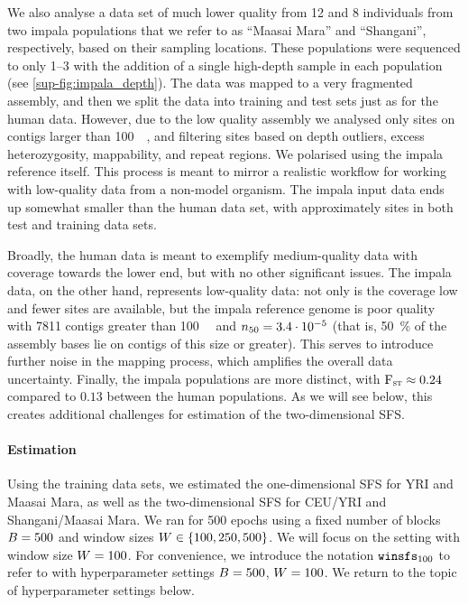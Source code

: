 We also analyse a data set of much lower quality from \num{12} and \num{8} individuals from two impala populations that we refer to as \enquote{Maasai Mara} and \enquote{Shangani}, respectively, based on their sampling locations. These populations were sequenced to only \SIrange{1}{3}{\depth} with the addition of a single high-depth sample in each population (see \cref{sup-fig:impala_depth}). The data was mapped to a very fragmented assembly, and then we split the data into training and test sets just as for the human data. However, due to the low quality assembly we analysed only sites on contigs larger than \SI{100}{\kilo\bases}, and filtering sites based on depth outliers, excess heterozygosity, mappability, and repeat regions. We polarised using the impala reference itself.
This process is meant to mirror a realistic workflow for working with low-quality data from a non-model organism.
The impala input data ends up somewhat smaller than the human data set, with approximately  sites in both test and training data sets.

Broadly, the human data is meant to exemplify medium-quality data with coverage towards the lower end, but with no other significant issues.
The impala data, on the other hand, represents low-quality data:
not only is the coverage low and fewer sites are available, but the impala reference genome is poor quality with \num{7811} contigs greater than \SI{100}{\kilo\bases} and $n_{50} = \scinum{3.4e-5}$ (that is, \SI{50}{\percent} of the assembly bases lie on contigs of this size or greater).
This serves to introduce further noise in the mapping process, which amplifies the overall data uncertainty.
Finally, the impala populations are more distinct, with $\text{F}_{\textsc{st}} \approx 0.24$ compared to $0.13$ between the human populations.
As we will see below, this creates additional challenges for estimation of the two-dimensional SFS.

\paragraph{Estimation}

Using the training data sets, we estimated the one-dimensional SFS for YRI and Maasai Mara, as well as the two-dimensional SFS for CEU/YRI and Shangani/Maasai Mara.
We ran \winsfs for \num{500} epochs using a fixed number of blocks $B = 500$ and window sizes $W \in \{100, 250, 500\}$.
We will focus on the setting with window size $W = 100$.
For convenience, we introduce the notation $\winsfs[100]$ to refer to \winsfs with hyperparameter settings $B = 500$, $W = 100$.
We return to the topic of hyperparameter settings below.

